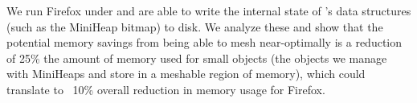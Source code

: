 We run Firefox under \Mesh and are able to write the internal state of
\Mesh's data structures (such as the MiniHeap bitmap) to disk.  We
analyze these and show that the potential memory savings from being
able to mesh near-optimally is a reduction of 25\% the amount of
memory used for small objects (the objects we manage with MiniHeaps
and store in a meshable region of memory), which could translate to
~10\% overall reduction in memory usage for Firefox.

